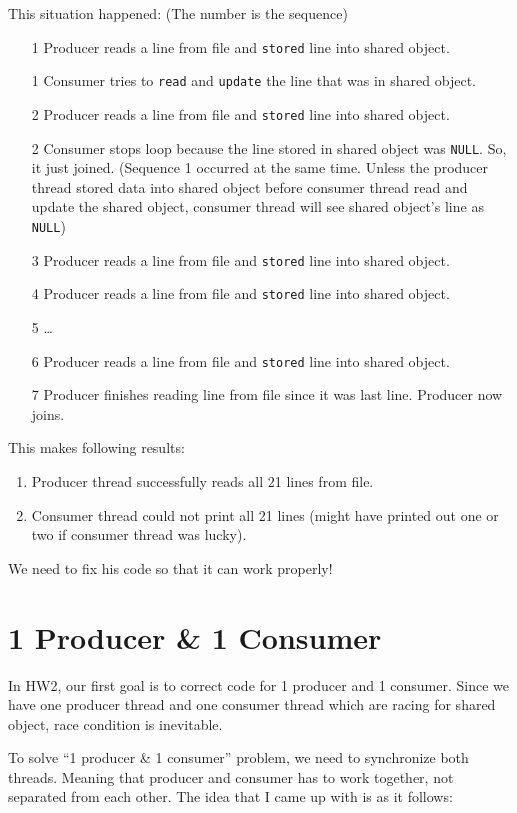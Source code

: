 \documentclass{homework}
\begin{document}
This situation happened: (The number is the sequence)
\begin{enumerate}
    \item[1] Producer reads a line from file and \texttt{stored} line into shared object.
    \item[1] Consumer tries to \texttt{read} and \texttt{update} the line that was in shared object.
    \item[2] Producer reads a line from file and \texttt{stored} line into shared object.
    \item[2] Consumer stops loop because the line stored in shared object was \texttt{NULL}. So, it just joined. (Sequence 1 occurred at the same time. Unless the producer thread stored data into shared object before consumer thread read and update the shared object, consumer thread will see shared object’s line as \texttt{NULL})
    \item[3] Producer reads a line from file and \texttt{stored} line into shared object.
    \item[4] Producer reads a line from file and \texttt{stored} line into shared object.
    \item[5] …
    \item[6] Producer reads a line from file and \texttt{stored} line into shared object.
    \item[7] Producer finishes reading line from file since it was last line. Producer now joins.
\end{enumerate}


This makes following results:
\begin{enumerate}
 \item Producer thread successfully reads all 21 lines from file.
 \item Consumer thread could not print all 21 lines (might have printed out one or two if consumer thread was lucky).
\end{enumerate}
We need to fix his code so that it can work properly!
\pagebreak

\section{1 Producer \& 1 Consumer}
In HW2, our first goal is to correct code for 1 producer and 1 consumer. Since we have one producer thread and one consumer thread which are racing for shared object, race condition is inevitable. 
\par
To solve “1 producer \& 1 consumer” problem, we need to synchronize both threads. Meaning that producer and consumer has to work together, not separated from each other. The idea that I came up with is as it follows:
\end{document}
